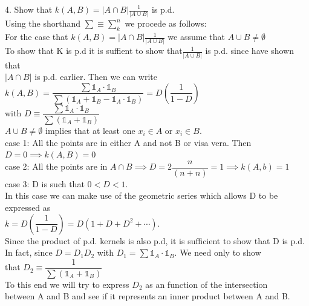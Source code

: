 \documentclass[18pt]{article}
\begin{document}
\begin{flushleft}
4. Show that $k(A,B)=|A \cap B| \frac{1}{|A \cup B|}$ is p.d.\\
\vspace{.4cm}
Using the shorthand $\sum \equiv \sum\limits_{k}^{n}$ we procede as follows:\\
For the case that $k(A,B)=|A \cap B| \frac{1}{|A \cup B|}$ we assume that $ A \cup B\neq \emptyset$\\
\vspace{.4cm}
To show that K is p.d it is suffient to show that$\frac{1}{|A \cup B|}$ is p.d. since have shown that\\
$|A \cap B|$ is p.d. earlier.
\vspace{.4cm}
Then we can write\\
\vspace{.3cm}
$k(A,B)=\dfrac{\sum \mathbb{1}_{A}\cdot \mathbb{1}_{B}}{\sum \left(\mathbb{1}_{A}+\mathbb{1}_{B}-\mathbb{1}_{A}\cdot\mathbb{1}_{B}\right)}=D \left(\dfrac{1}{1-D}\right)$\\
\vspace{.3cm}
with $D\equiv\dfrac{\sum \mathbb{1}_{A}\cdot\mathbb{1}_{B}}{\sum(\mathbb{1}_{A} + \mathbb{1}_{B})}$\\
\vspace{.4cm}
$A \cup B\neq \emptyset$ implies that at least one $x_i \in A$ or $x_i \in B$.\\
\vspace{.3cm}
case 1: All the points are in either A and not B or visa vera. Then $D=0\implies k(A,B)=0$\\
\vspace{.3cm}
case 2: All the points are in $A \cap B \implies D=2\dfrac{n}{(n+n)}=1 \implies k(A,b)=1$\\
\vspace{.3cm}
case 3: D is such that $0< D<1$.\\
\vspace{.4cm}
In this case we can make use of the geometric series which allows D to be expressed as\\
\vspace{.3cm}
$k=D \left(\dfrac{1}{1-D}\right)=D \left(1+D+D^2+\cdots\right)$.\\
\vspace{.3cm}
Since the product of p.d. kernels is also p.d, it is sufficient to show that D is p.d. In fact, since $D=D_1 D_2$ with $D_1=\sum \mathbb{1}_{A}\cdot\mathbb{1}_{B}$. We need only to show\\
that $D_2\equiv\dfrac{1}{\sum(\mathbb{1}_{A} + \mathbb{1}_{B})}$\\
\vspace{.3cm}
To this end we will try to express $D_2$ as an function of the intersection \\
between A and B and see if it represents an inner product between A and B.\\



\end{flushleft}
\end{document}
